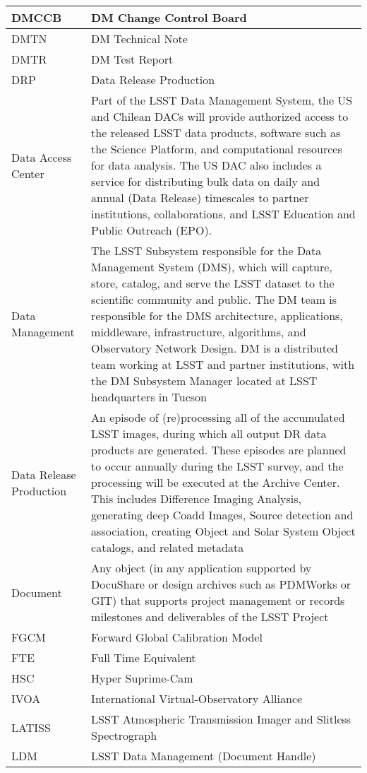 \begin{longtable}{|p{}|p{}|}
DMCCB & DM Change Control Board \\\hline
DMTN & DM Technical Note \\\hline
DMTR & DM Test Report \\\hline
DRP & Data Release Production \\\hline
Data Access Center & Part of the LSST Data Management System, the US and Chilean DACs will provide authorized access to the released LSST data products, software such as the Science Platform, and computational resources for data analysis. The US DAC also includes a service for distributing bulk data on daily and annual (Data Release) timescales to partner institutions, collaborations, and LSST Education and Public Outreach (EPO).  \\\hline
Data Management & The LSST Subsystem responsible for the Data Management System (DMS), which will capture, store, catalog, and serve the LSST dataset to the scientific community and public. The DM team is responsible for the DMS architecture, applications, middleware, infrastructure, algorithms, and Observatory Network Design. DM is a distributed team working at LSST and partner institutions, with the DM Subsystem Manager located at LSST headquarters in Tucson \\\hline
Data Release Production & An episode of (re)processing all of the accumulated LSST images, during which all output DR data products are generated. These episodes are planned to occur annually during the LSST survey, and the processing will be executed at the Archive Center. This includes Difference Imaging Analysis, generating deep Coadd Images, Source detection and association, creating Object and Solar System Object catalogs, and related metadata \\\hline
Document & Any object (in any application supported by DocuShare or design archives such as PDMWorks or GIT) that supports project management or records milestones and deliverables of the LSST Project \\\hline
FGCM &  Forward Global Calibration Model \\\hline
FTE & Full Time Equivalent \\\hline
HSC & Hyper Suprime-Cam \\\hline
IVOA & International Virtual-Observatory Alliance \\\hline
LATISS & LSST Atmospheric Transmission Imager and Slitless Spectrograph \\\hline
LDM & LSST Data Management (Document Handle) \\\hline

\end{longtable}
